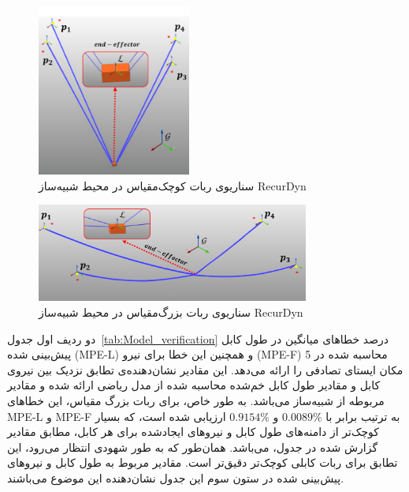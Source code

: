 \begin{figure} [t]
	\centering
	\includegraphics[width=0.45\textwidth]{img/E2_small.pdf}
	\caption{سناریوی ربات کوچک‌مقیاس در محیط شبیه‌ساز RecurDyn}
	\label{fig:recurdyn_small}
\end{figure}

\begin{figure} [b]
	\centering
	\includegraphics[width=0.8\textwidth]{img/E1_large.pdf}
	\caption{سناریوی ربات بزرگ‌مقیاس در محیط شبیه‌ساز RecurDyn}
	\label{fig:recurdyn_large}
\end{figure}

دو ردیف اول جدول~\ref{tab:Model_verification} درصد خطاهای میانگین در طول کابل پیش‌بینی شده (MPE-L) و همچنین این خطا برای نیرو (MPE-F) محاسبه شده در 5 مکان ایستای تصادفی را ارائه می‌دهد. این مقادیر نشان‌دهنده‌ی تطابق نزدیک بین نیروی کابل و مقادیر طول کابل خم‌شده محاسبه شده از مدل ریاضی ارائه شده و مقادیر مربوطه از شبیه‌ساز می‌باشد. به طور خاص، برای ربات بزرگ مقیاس، این خطاهای MPE-L و MPE-F به ترتیب برابر با
 $0.0089\%$ 
 و 
 $0.9154\%$ 
 ارزیابی شده است، که بسیار کوچک‌تر از دامنه‌های طول کابل و نیرو‌های ایجادشده برای هر کابل، مطابق مقادیر گزارش شده در جدول، می‌باشد. همان‌طور که به طور شهودی انتظار می‌رود، این تطابق برای ربات کابلی کوچک‌تر دقیق‌تر است. مقادیر مربوط به طول کابل و نیروهای پیش‌بینی شده در ستون سوم این جدول نشان‌دهنده این موضوع می‌باشند.

